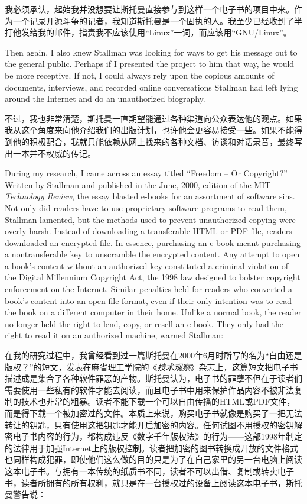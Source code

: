 \ifdefined\chs
我必须承认，起始我并没想要让斯托曼直接参与到这样一个电子书的项目中来。作为一个记录开源斗争的记者，我知道斯托曼是一个固执的人。我至少已经收到了半打他发给我的邮件，指责我不应该使用``Linux''一词，而应该用``GNU/Linux''。
\fi

\ifdefined\eng
Then again, I also knew Stallman was looking for ways to get his message out to the general public. Perhaps if I presented the project to him that way, he would be more receptive. If not, I could always rely upon the copious amounts of documents, interviews, and recorded online conversations Stallman had left lying around the Internet and do an unauthorized biography.
\fi

\ifdefined\chs
不过，我也非常清楚，斯托曼一直期望能通过各种渠道向公众表达他的观点。如果我从这个角度来向他介绍我们的出版计划，也许他会更容易接受一些。如果不能得到他的积极配合，我就只能依赖从网上找来的各种文档、访谈和对话录音，最终写出一本并不权威的传记。
\fi

\ifdefined\eng
During my research, I came across an essay titled ``Freedom -- Or Copyright?'' Written by Stallman and published in the June, 2000, edition of the MIT \textit{Technology Review}, the essay blasted e-books for an assortment of software sins. Not only did readers have to use proprietary software programs to read them, Stallman lamented, but the methods used to prevent unauthorized copying were overly harsh. Instead of downloading a transferable HTML or PDF file, readers downloaded an encrypted file. In essence, purchasing an e-book meant purchasing a nontransferable key to unscramble the encrypted content. Any attempt to open a book's content without an authorized key constituted a criminal violation of the Digital Millennium Copyright Act, the 1998 law designed to bolster copyright enforcement on the Internet. Similar penalties held for readers who converted a book's content into an open file format, even if their only intention was to read the book on a different computer in their home. Unlike a normal book, the reader no longer held the right to lend, copy, or resell an e-book. They only had the right to read it on an authorized machine, warned Stallman:
\fi

\ifdefined\chs
在我的研究过程中，我曾经看到过一篇斯托曼在2000年6月时所写的名为``自由还是版权？''的短文，发表在麻省理工学院的《\textit{技术观察}》杂志上，这篇短文把电子书描述成是集合了各种软件罪恶的产物。斯托曼认为，电子书的罪孽不但在于读者们需要使用一些私有的软件才能去阅读，而且电子书中用来保护作品内容不被非法复制的技术也非常的粗暴。读者不能下载一个可以自由传播的HTML或PDF文件，而是得下载一个被加密过的文件。本质上来说，购买电子书就像是购买了一把无法转让的钥匙，只有使用这把钥匙才能开启加密的内容。任何试图不用授权的密钥解密电子书内容的行为，都构成违反《数字千年版权法》的行为——这部1998年制定的法律用于加强Internet上的版权控制。读者把加密的图书转换成开放的文件格式也同样构成犯罪，即使他们这么做的目的只是为了在自己家里的另一台电脑上阅读这本电子书。与拥有一本传统的纸质书不同，读者不可以出借、复制或转卖电子书，读者所拥有的所有权利，就只是在一台授权过的设备上阅读这本电子书，斯托曼警告说：
\fi

